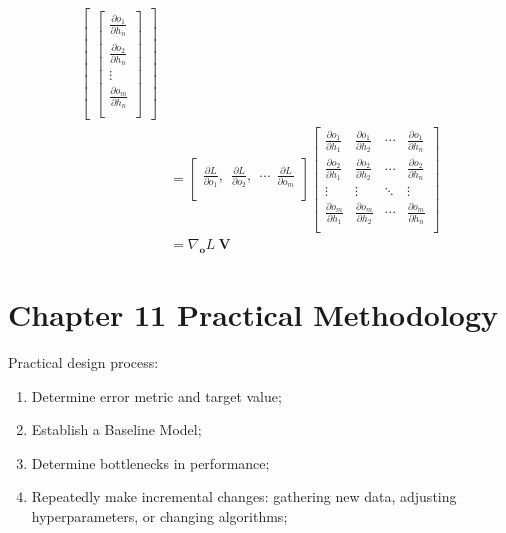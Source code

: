 \documentclass[12pt]{article}
\numberwithin{equation}{section}
\begin{document}
\begin{equation}
\begin{split}
\begin{bmatrix}
\begin{bmatrix}
	\frac{\partial o_1}{\partial h_n}\\
	\frac{\partial o_2}{\partial h_n}\\
	\vdots\\
	\frac{\partial o_m}{\partial h_n}\\
	\end{bmatrix}
\end{bmatrix} \\&= 
\begin{bmatrix}
\frac{\partial L}{\partial o_1},
\ \ \frac{\partial L}{\partial o_2},
\ \ \cdots
\ \ \frac{\partial L}{\partial o_m}\\
\end{bmatrix}
\begin{bmatrix}
\frac{\partial o_{1}}{\partial h_1} & \frac{\partial o_{1}}{\partial h_2} & \cdots & \frac{\partial o_{1}}{\partial h_n}\\
\frac{\partial o_{2}}{\partial h_1} & \frac{\partial o_{2}}{\partial h_2} & \cdots & \frac{\partial o_{2}}{\partial h_n}\\
\vdots & \vdots & \ddots & \vdots\\
\frac{\partial o_{m}}{\partial h_1} & \frac{\partial o_{m}}{\partial h_2} & \cdots & \frac{\partial o_{m}}{\partial h_n}\\
\end{bmatrix} \\&= 
\nabla_{\mathbf{o}} L \ \mathbf{V}
\end{split}\end{equation}
\section{Chapter 11 Practical Methodology}
Practical design process:
\begin{enumerate}
	\item Determine error metric and target value;
	\item Establish a Baseline Model;
	\item Determine bottlenecks in performance;
	\item Repeatedly make incremental changes: gathering new data, adjusting hyperparameters, or changing algorithms;
\end{enumerate}
\end{document}
